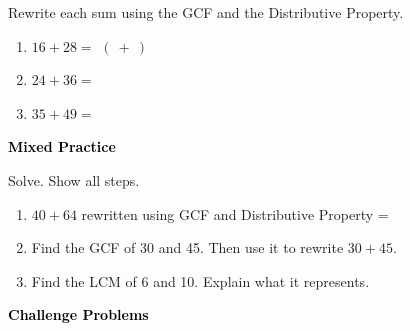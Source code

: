 \documentclass[12pt, letterpaper, fleqn]{article}
\newcommand{\blank}{\underline{\hspace{2.2cm}}}
\begin{document}
\noindent
Rewrite each sum using the GCF and the Distributive Property.

\vspace{3mm}
\begin{enumerate}[itemsep=2.2cm, leftmargin=0.6cm]
\item $16 + 28 = $ \blank$(\ + \ )$

\vspace{2cm}

\item $24 + 36 = $ \blank

\vspace{2cm}

\item $35 + 49 = $ \blank

\vspace{2cm}

\end{enumerate}

\newpage

\begin{tcolorbox}[colback=black!10]
\large\textcolor{black}{\textbf{Mixed Practice}}
\end{tcolorbox}

\noindent
Solve. Show all steps.

\vspace{3mm}
\begin{enumerate}[itemsep=2.3cm, leftmargin=0.6cm]
\item $40 + 64$ rewritten using GCF and Distributive Property = \blank

\vspace{2.2cm}

\item Find the GCF of 30 and 45. Then use it to rewrite $30 + 45$.

\vspace{2.2cm}

\item Find the LCM of 6 and 10. Explain what it represents.

\vspace{2.2cm}

\end{enumerate}

\newpage

\begin{tcolorbox}[colback=black!10]
\large\textcolor{black}{\textbf{Challenge Problems}}
\end{tcolorbox}
\end{document}
